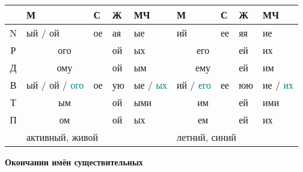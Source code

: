 \documentclass[a4paper, landscape, 11pt]{article}
\newcommand{\an}[1]{\textcolor{teal}{#1}} %
\begin{document}
\begin{tabularx}{\textwidth}{|c|X|X|X|X||X|X|X|X|}
	\hline
	  & М                   & С  & Ж  & МЧ                     & М             & С        & Ж  & МЧ           \\ \hline
	N & ый / ой             & ое & ая & ые                     & ий            & ее       & яя & ие           \\
	Р & \multicolumn{2}{c|}{ого} & ой & ых                     & \multicolumn{2}{c|}{его} & ей & их           \\
	Д & \multicolumn{2}{c|}{ому} & ой & ым                     & \multicolumn{2}{c|}{ему} & ей & им           \\
	В & ый / ой  / \an{ого} & ое & ую & ые / \an{ых}           & ий / \an{его} & ее       & юю & ие / \an{их} \\
	Т & \multicolumn{2}{c|}{ым}  & ой & ыми                    & \multicolumn{2}{c|}{им}  & ей & ими          \\
	П & \multicolumn{2}{c|}{ом}  & ой & ых                     & \multicolumn{2}{c|}{ем}  & ей & их           \\ \hline
	  & \multicolumn{4}{l||}{активный, живой} & \multicolumn{4}{l|}{летний, синий}           \\ \hline
\end{tabularx}

\vfill

\begin{center}
\Huge\bfseries Окончании имён существительных
\end{center}
\end{document}
